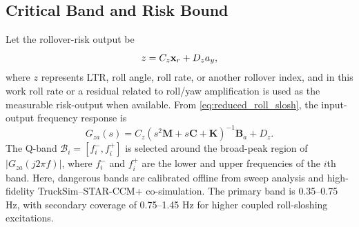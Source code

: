 \subsection{Critical Band and Risk Bound}
Let the rollover-risk output be
\begin{equation}
    z=C_z\mathbf{x}_r+D_za_y ,
\end{equation}
where $z$ represents LTR, roll angle, roll rate, or another rollover index, and in this work roll rate or a residual related to roll/yaw amplification is used as the measurable risk-output when available. From \eqref{eq:reduced_roll_slosh}, the input-output frequency response is
\begin{equation}
    G_{za}(s)=C_z(s^2\mathbf{M}+s\mathbf{C}+\mathbf{K})^{-1}\mathbf{B}_a+D_z .
    \label{eq:freq_response}
\end{equation}
The Q-band $\mathcal{B}_i=[f_i^-,f_i^+]$ is selected around the broad-peak region of $|G_{za}(j2\pi f)|$, where $f_i^-$ and $f_i^+$ are the lower and upper frequencies of the $i$th band. Here, dangerous bands are calibrated offline from sweep analysis and high-fidelity TruckSim--STAR-CCM+ co-simulation. The primary band is 0.35--0.75 Hz, with secondary coverage of 0.75--1.45 Hz for higher coupled roll-sloshing excitations.

